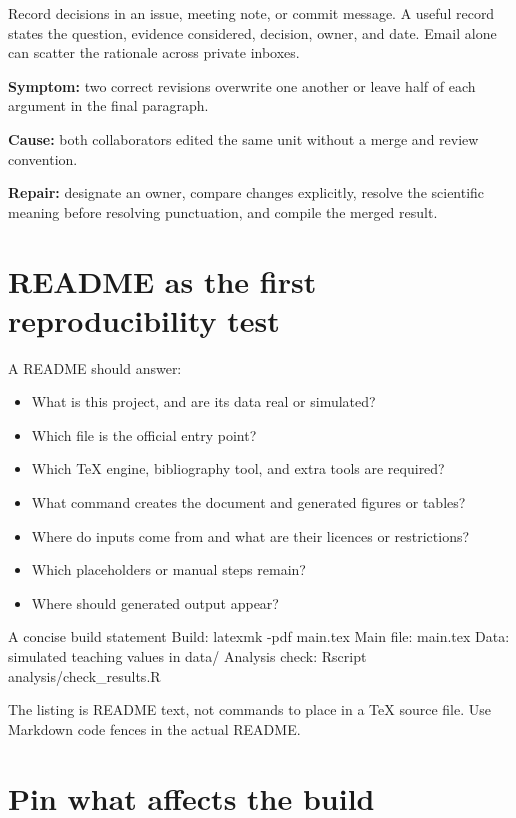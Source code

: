 Record decisions in an issue, meeting note, or commit message. A useful record
states the question, evidence considered, decision, owner, and date. Email alone
can scatter the rationale across private inboxes.

\begin{commonerror}
\textbf{Symptom:} two correct revisions overwrite one another or leave half of
each argument in the final paragraph.

\textbf{Cause:} both collaborators edited the same unit without a merge and
review convention.

\textbf{Repair:} designate an owner, compare changes explicitly, resolve the
scientific meaning before resolving punctuation, and compile the merged result.
\end{commonerror}

\section{README as the first reproducibility test}

A README should answer:

\begin{itemize}
  \item What is this project, and are its data real or simulated?
  \item Which file is the official entry point?
  \item Which TeX engine, bibliography tool, and extra tools are required?
  \item What command creates the document and generated figures or tables?
  \item Where do inputs come from and what are their licences or restrictions?
  \item Which placeholders or manual steps remain?
  \item Where should generated output appear?
\end{itemize}

\begin{latexcode}{A concise build statement}
Build: latexmk -pdf main.tex
Main file: main.tex
Data: simulated teaching values in data/
Analysis check: Rscript analysis/check_results.R
\end{latexcode}

The listing is README text, not commands to place in a TeX source file. Use
Markdown code fences in the actual README.

\section{Pin what affects the build}

